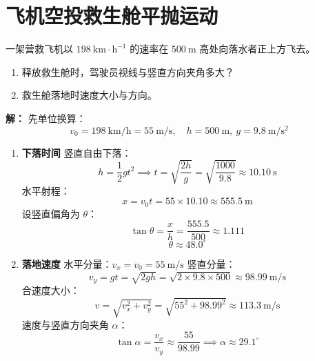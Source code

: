 \section{飞机空投救生舱平抛运动}
\begin{center}
\end{center}
一架营救飞机以 $198\ \mathrm{km\cdot h^{-1}}$ 的速率在 $500\ \mathrm{m}$ 高处向落水者正上方飞去。
\begin{enumerate}
    \item 释放救生舱时，驾驶员视线与竖直方向夹角多大？
    \item 救生舱落地时速度大小与方向。
\end{enumerate}

\noindent\textbf{解：}
先单位换算：
\[
v_0 = 198\ \mathrm{km/h} = 55\ \mathrm{m/s},\quad h=500\ \mathrm{m},\ g=9.8\ \mathrm{m/s^2}
\]

\begin{enumerate}
    \item \textbf{下落时间}
竖直自由下落：
\[
h = \frac12 g t^2 \implies t=\sqrt{\frac{2h}{g}}
=\sqrt{\frac{1000}{9.8}}\approx 10.10\ \mathrm{s}
\]
水平射程：
\[
x = v_0 t = 55 \times 10.10 \approx 555.5\ \mathrm{m}
\]
设竖直偏角为 $\theta$：
\[
\tan\theta = \frac{x}{h} = \frac{555.5}{500}\approx 1.111
\]
\[
\boxed{\theta \approx 48.0^\circ}
\]

    \item \textbf{落地速度}
水平分量：$v_x=v_0=55\ \mathrm{m/s}$
竖直分量：
\[
v_y = gt = \sqrt{2gh} = \sqrt{2\times9.8\times500}\approx98.99\ \mathrm{m/s}
\]
合速度大小：
\[
v=\sqrt{v_x^2+v_y^2}
=\sqrt{55^2+98.99^2}\approx \boxed{113.3\ \mathrm{m/s}}
\]
速度与竖直方向夹角 $\alpha$：
\[
\tan\alpha = \frac{v_x}{v_y} \approx \frac{55}{98.99} \implies \alpha\approx 29.1^\circ
\]
\end{enumerate}